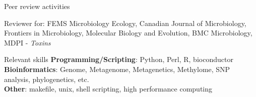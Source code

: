 \documentclass{resume} %
\begin{document}

\begin{rSection}{Peer review activities}

Reviewer for: FEMS Microbiology Ecology, Canadian Journal of Microbiology, Frontiers in Microbiology, Molecular Biology and Evolution, BMC Microbiology, MDPI - \textit{Toxins}
\end{rSection}



\begin{rSection}{Relevant skills}
{\bf Programming/Scripting}: Python, Perl, R, bioconductor\\
{\bf Bioinformatics}: Genome, Metagenome, Metagenetics, Methylome, SNP analysis, phylogenetics, etc.\\
{\bf Other}: makefile, unix, shell scripting, high performance computing\\
\end{rSection}






\end{document}
